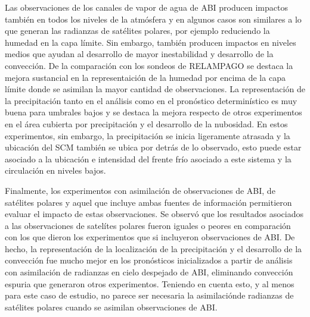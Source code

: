 \documentclass[12pt,oneside,a4paper]{reedthesis}
\begin{document}
Las observaciones de los canales de vapor de agua de ABI producen impactos también en todos los niveles de la atmósfera y en algunos casos son similares a lo que generan las radianzas de satélites polares, por ejemplo reduciendo la humedad en la capa límite. Sin embargo, también producen impactos en niveles medios que ayudan al desarrollo de mayor inestabilidad y desarrollo de la convección. De la comparación con los sondeos de RELAMPAGO se destaca la mejora sustancial en la representaición de la humedad por encima de la capa límite donde se asimilan la mayor cantidad de observaciones. La representación de la precipitación tanto en el análisis como en el pronóstico determinístico es muy buena para umbrales bajos y se destaca la mejora respecto de otros experimentos en el área cubierta por precipitación y el desarrollo de la nubosidad. En estos experimentos, sin embargo, la precipitación se inicia ligeramente atrasada y la ubicación del SCM también se ubica por detrás de lo observado, esto puede estar asociado a la ubicación e intensidad del frente frío asociado a este sistema y la circulación en niveles bajos.

Finalmente, los experimentos con asimilación de observaciones de ABI, de satélites polares y aquel que incluye ambas fuentes de información permitieron evaluar el impacto de estas observaciones. Se observó que los resultados asociados a las observaciones de satelítes polares fueron iguales o peores en comparación con los que dieron los experimentos que si incluyeron observaciones de ABI. De hecho, la representación de la localización de la precipitación y el desarrollo de la convección fue mucho mejor en los pronósticos inicializados a partir de análisis con asimilación de radianzas en cielo despejado de ABI, eliminando convección espuria que generaron otros experimentos. Teniendo en cuenta esto, y al menos para este caso de estudio, no parece ser necesaria la asimilaciónde radianzas de satélites polares cuando se asimilan observaciones de ABI.
\end{document}
